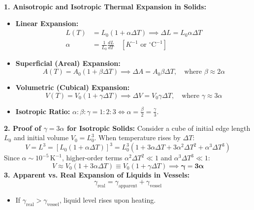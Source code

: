\documentclass[10pt,twoside,openright]{book}
\begin{document}
\begin{formulabox}
\textbf{1. Anisotropic and Isotropic Thermal Expansion in Solids:}
\begin{itemize}
  \item \textbf{Linear Expansion:}
  \begin{align}
    L(T) &= L_0 (1 + \alpha \Delta T) \implies \Delta L = L_0 \alpha \Delta T \\
    \alpha &= \frac{1}{L_0}\frac{dL}{dT} \quad [\si{K^{-1}} \text{ or } ^\circ\mathrm{C}^{-1}] \nonumber
  \end{align}
  \item \textbf{Superficial (Areal) Expansion:}
  \begin{equation}
    A(T) = A_0 (1 + \beta \Delta T) \implies \Delta A = A_0 \beta \Delta T, \quad \text{where } \beta \approx 2\alpha
  \end{equation}
  \item \textbf{Volumetric (Cubical) Expansion:}
  \begin{equation}
    V(T) = V_0 (1 + \gamma \Delta T) \implies \Delta V = V_0 \gamma \Delta T, \quad \text{where } \gamma \approx 3\alpha
  \end{equation}
  \item \textbf{Isotropic Ratio:} $\alpha : \beta : \gamma = 1 : 2 : 3 \iff \alpha = \frac{\beta}{2} = \frac{\gamma}{3}$.
\end{itemize}
\textbf{2. Proof of $\gamma = 3\alpha$ for Isotropic Solids:}
Consider a cube of initial edge length $L_0$ and initial volume $V_0 = L_0^3$. When temperature rises by $\Delta T$:
\begin{equation}
  V = L^3 = [L_0(1 + \alpha\Delta T)]^3 = L_0^3(1 + 3\alpha\Delta T + 3\alpha^2\Delta T^2 + \alpha^3\Delta T^3)
\end{equation}
Since $\alpha \sim 10^{-5}\,\mathrm{K}^{-1}$, higher-order terms $\alpha^2\Delta T^2 \ll 1$ and $\alpha^3\Delta T^3 \ll 1$:
\begin{equation}
  V \approx V_0(1 + 3\alpha\Delta T) \equiv V_0(1 + \gamma\Delta T) \implies \mathbf{\gamma = 3\alpha}
\end{equation}
\textbf{3. Apparent vs. Real Expansion of Liquids in Vessels:}
\begin{equation}
  \gamma_{\text{real}} = \gamma_{\text{apparent}} + \gamma_{\text{vessel}}
\end{equation}
\begin{itemize}
  \item If $\gamma_{\text{real}} > \gamma_{\text{vessel}}$, liquid level rises upon heating.

\end{itemize}
\end{formulabox}
\end{document}
